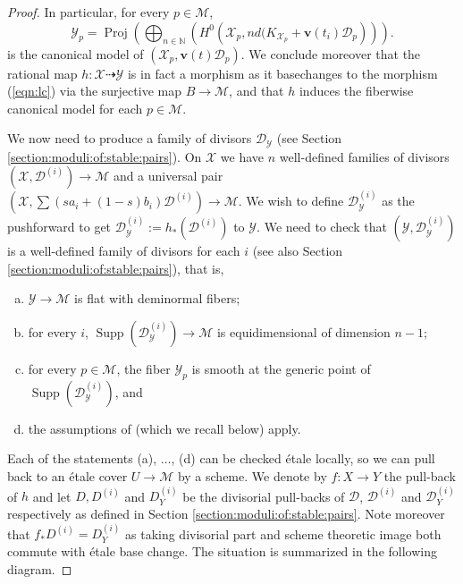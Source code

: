 \documentclass[11pt]{amsart}
\theoremstyle{definition}
\theoremstyle{remark}
\newcommand{\calX}{\mathcal X}
\newcommand{\calY}{\mathcal Y}
\newcommand{\calD}{\mathcal D}
\newcommand{\sM}{\mathscr{M}}
\newcommand{\Supp}{\operatorname{Supp}}
\newcommand{\Proj}{\operatorname{Proj}}
\newcommand{\bfv}{\mathbf{v}}
\begin{document}
\begin{proof}
		In particular, for every $p \in \sM$, 
		\begin{equation*}
			\calY_p = \Proj\left(\bigoplus_{n \in \mathbb{N}}\left(H^0\left(\calX_p,nd(K_{\calX_p}+\mathbf{v}(t_i)\calD_p\right)\right)\right).
		\end{equation*}
		is the canonical model of $(\calX_p, \bfv(t)\calD_p)$. We conclude moreover that the rational map $h: \calX \dashrightarrow \calY$ is in fact a morphism as it basechanges to the morphism (\ref{eqn:lc}) via the surjective map $B \to \sM$, and that $h$ induces the fiberwise canonical model for each $p \in \sM$. 
		
		
		
		We now need to produce a family of divisors $\calD_\calY$ (see Section \ref{section:moduli:of:stable:pairs}). On $\calX$ we have $n$ well-defined families of divisors $\left(\calX,\calD^{(i)}\right) \to \sM$ and a universal pair $\left(\calX,\sum (s a_i + (1-s)b_i) \calD^{(i)}\right) \to \sM$. 
		We wish to define $\calD_\calY^{(i)}$ as the pushforward  to get $\calD^{(i)}_\calY:=h_*\left(\calD^{(i)}\right)$ to $\calY$. 
		We need to check that $\left(\calY,\calD^{(i)}_\calY\right)$ is a well-defined family of divisors for each $i$
		\cite[Definition 4.2]{kollarmodulibook} (see also Section \ref{section:moduli:of:stable:pairs}), that is,
		\begin{enumerate}[(a)]
			\item $\calY \to \sM$ is flat with deminormal fibers;
			\item for every $i$, $\Supp\left(\calD^{(i)}_{\calY}\right) \to \sM$ is equidimensional of dimension $n-1$;
			\item for every $p \in \sM$, the fiber $\calY_p$ is smooth at the generic point of $\Supp\left(\calD^{(i)}_{\calY}\right)$, and
			\item the assumptions of \cite[Corollary 4.5 (2)]{kollarmodulibook} (which we recall below) apply.
		\end{enumerate}
		
		Each of the statements (a), $\ldots$, (d) can be checked \'etale locally, so we can pull back to an \'etale cover $U \to \sM$ by a scheme. We denote by $f : X \to Y$ the pull-back of $h$ and let $D, D^{(i)}$ and $D_Y^{(i)}$ be the divisorial pull-backs of $\calD$, $\calD^{(i)}$ and $\calD_Y^{(i)}$ respectively as defined in Section \ref{section:moduli:of:stable:pairs}. Note moreover that $f_*D^{(i)} = D_Y^{(i)}$ as taking divisorial part and scheme theoretic image both commute with \'etale base change. The situation is summarized in the following diagram. 
		

\end{proof}
\end{document}
